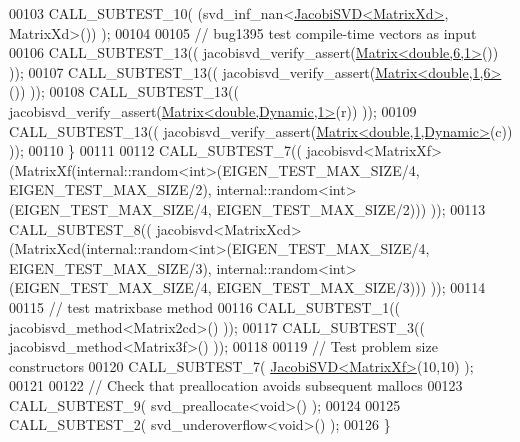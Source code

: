 \begin{DoxyCode}
00103     CALL\_SUBTEST\_10( (svd\_inf\_nan<\hyperlink{group___s_v_d___module_class_eigen_1_1_jacobi_s_v_d}{JacobiSVD<MatrixXd>}, MatrixXd>()) );
00104 
00105     \textcolor{comment}{// bug1395 test compile-time vectors as input}
00106     CALL\_SUBTEST\_13(( jacobisvd\_verify\_assert(\hyperlink{group___core___module_class_eigen_1_1_matrix}{Matrix<double,6,1>}()) ));
00107     CALL\_SUBTEST\_13(( jacobisvd\_verify\_assert(\hyperlink{group___core___module_class_eigen_1_1_matrix}{Matrix<double,1,6>}()) ));
00108     CALL\_SUBTEST\_13(( jacobisvd\_verify\_assert(\hyperlink{group___core___module_class_eigen_1_1_matrix}{Matrix<double,Dynamic,1>}(r)) ));
00109     CALL\_SUBTEST\_13(( jacobisvd\_verify\_assert(\hyperlink{group___core___module_class_eigen_1_1_matrix}{Matrix<double,1,Dynamic>}(c)) ));
00110   \}
00111 
00112   CALL\_SUBTEST\_7(( jacobisvd<MatrixXf>(MatrixXf(internal::random<int>(EIGEN\_TEST\_MAX\_SIZE/4, 
      EIGEN\_TEST\_MAX\_SIZE/2), internal::random<int>(EIGEN\_TEST\_MAX\_SIZE/4, EIGEN\_TEST\_MAX\_SIZE/2))) ));
00113   CALL\_SUBTEST\_8(( jacobisvd<MatrixXcd>(MatrixXcd(internal::random<int>(EIGEN\_TEST\_MAX\_SIZE/4, 
      EIGEN\_TEST\_MAX\_SIZE/3), internal::random<int>(EIGEN\_TEST\_MAX\_SIZE/4, EIGEN\_TEST\_MAX\_SIZE/3))) ));
00114 
00115   \textcolor{comment}{// test matrixbase method}
00116   CALL\_SUBTEST\_1(( jacobisvd\_method<Matrix2cd>() ));
00117   CALL\_SUBTEST\_3(( jacobisvd\_method<Matrix3f>() ));
00118 
00119   \textcolor{comment}{// Test problem size constructors}
00120   CALL\_SUBTEST\_7( \hyperlink{group___s_v_d___module_class_eigen_1_1_jacobi_s_v_d}{JacobiSVD<MatrixXf>}(10,10) );
00121 
00122   \textcolor{comment}{// Check that preallocation avoids subsequent mallocs}
00123   CALL\_SUBTEST\_9( svd\_preallocate<void>() );
00124 
00125   CALL\_SUBTEST\_2( svd\_underoverflow<void>() );
00126 \}
\end{DoxyCode}
